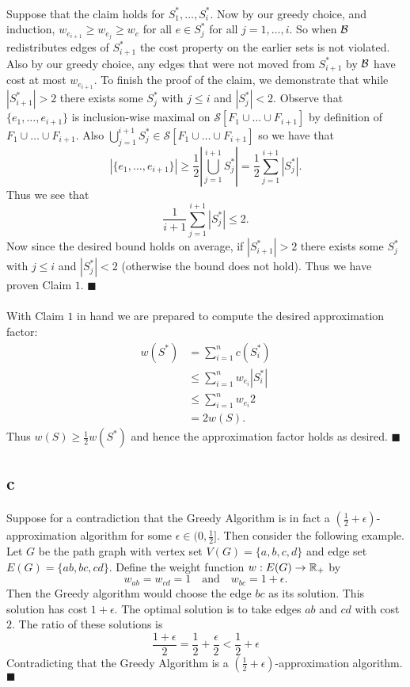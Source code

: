 \documentclass[letterpaper,12pt,oneside,onecolumn]{article}
\newcommand{\cS}{\mathcal{S}} \newcommand{\cT}{\mathcal{T}}
\begin{document}
\paragraph{}
Suppose that the claim holds for $S^*_1 ,\dots, S^*_i$. Now by our greedy choice, and induction, $w_{e_{i+1}} \geq w_{e_j} \geq w_e$ for all $e \in S^*_j$ for all $j = 1,\dots, i$. So when $\mathcal{B}$ redistributes edges of $S^*_{i+1}$ the cost property on the earlier sets is not violated. Also by our greedy choice, any edges that were not moved from $S^*_{i+1}$ by $\mathcal{B}$ have cost at most $w_{e_{i+1}}$. To finish the proof of the claim, we demonstrate that while $|S_{i+1}^*| > 2$ there exists some $S^*_j$ with $j\leq i$ and $|S^*_j| < 2$. Observe that $\{e_1, \dots, e_{i+1}\}$ is inclusion-wise maximal on $\cS[F_1 \cup \dots \cup F_{i+1}]$ by definition of $F_1 \cup \dots \cup F_{i+1}$. Also $\bigcup_{j=1}^{i+1} S^*_j \in \cS[F_1 \cup \dots \cup F_{i+1}]$ so we have that
$$|\{e_1, \dots, e_{i+1}\}| \geq \frac{1}{2} |\bigcup_{j=1}^{i+1} S^*_j | = \frac{1}{2} \sum_{j=1}^{i+1} |S^*_j|.$$
Thus we see that
$$ \frac{1}{i+1}\sum_{j=1}^{i+1} |S^*_j| \leq 2.$$
Now since the desired bound holds on average, if $|S^*_{i+1}| > 2$ there exists some $S^*_j$ with $j \leq i$ and $|S^*_j| < 2$ (otherwise the bound does not hold). Thus we have proven Claim $1$. $\blacksquare$
\paragraph{}
With Claim $1$ in hand we are prepared to compute the desired approximation factor:
\begin{align*}
w(S^*) &= \sum_{i=1}^n c(S^*_i) \\
&\leq \sum_{i=1}^n w_{e_i} |S^*_i| \\
&\leq \sum_{i=1}^n w_{e_i} 2 \\
&= 2 w(S).
\end{align*}
Thus $w(S) \geq \frac{1}{2} w(S^*)$ and hence the approximation factor holds as desired. $\blacksquare$
	\subsection{c}
	\paragraph{}
	Suppose for a contradiction that the Greedy Algorithm is in fact a $(\frac{1}{2} + \epsilon)$-approximation algorithm for some $\epsilon \in (0, \frac{1}{2}]$. Then consider the following example. Let $G$ be the path graph with vertex set $V(G) = \{a,b,c,d\}$ and edge set $E(G) = \{ab, bc,cd\}$. Define the weight function $w : E(G) \rightarrow \mathbb{R}_+$ by
	$$w_{ab} = w_{cd} = 1 \quad\text{and}\quad w_{bc} = 1+\epsilon.$$
	Then the Greedy algorithm would choose the edge $bc$ as its solution. This solution has cost $1+\epsilon$. The optimal solution is to take edges $ab$ and $cd$ with cost $2$. The ratio of these solutions is
	$$ \frac{1+\epsilon}{2} = \frac{1}{2} + \frac{\epsilon}{2} < \frac{1}{2} + \epsilon$$
	Contradicting that the Greedy Algorithm is a $(\frac{1}{2} + \epsilon)$-approximation algorithm. $\blacksquare$
\end{document}
